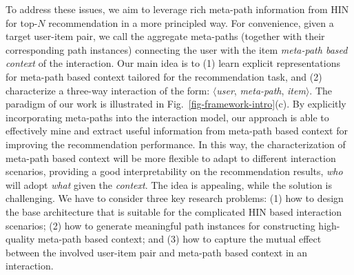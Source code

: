 To address these issues, we aim to leverage rich meta-path information from HIN for top-$N$ recommendation in a more principled way. For convenience,  given a target user-item pair, we call the aggregate meta-paths (together with their corresponding path instances) connecting the user with the item \emph{meta-path based context} of the interaction.
Our main idea is to (1) learn explicit representations for  meta-path based context tailored for the recommendation task, and (2) characterize a three-way interaction of the form:  $\langle$\emph{user}, \emph{meta-path}, \emph{item}$\rangle$. The paradigm of our work is illustrated in Fig.~\ref{fig-framework-intro}(c).
By explicitly incorporating meta-paths into the interaction model,  our approach is able to effectively mine and extract useful information from meta-path based context for improving the recommendation performance.
In this way, the characterization of  meta-path based context will be more flexible to adapt to different interaction scenarios, providing a good
interpretability on the recommendation results, \ie \emph{who} will adopt \emph{what} given the \emph{context}.
The idea is appealing, while the solution is challenging.  We have to consider three key research problems: (1) how to design the base architecture that is suitable for the complicated HIN based interaction scenarios; (2) how to generate meaningful path instances for constructing high-quality meta-path based context; and (3) how to capture the mutual effect between the involved user-item pair and meta-path based context in an interaction.


